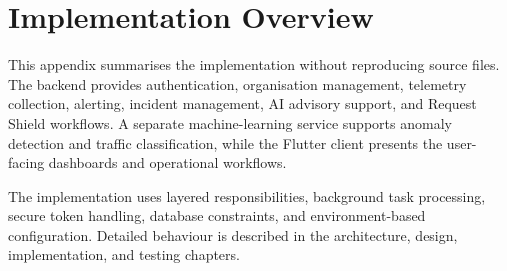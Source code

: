 \chapter{Implementation Overview}

This appendix summarises the implementation without reproducing source files.
The backend provides authentication, organisation management, telemetry
collection, alerting, incident management, AI advisory support, and Request
Shield workflows. A separate machine-learning service supports anomaly
detection and traffic classification, while the Flutter client presents the
user-facing dashboards and operational workflows.

The implementation uses layered responsibilities, background task processing,
secure token handling, database constraints, and environment-based
configuration. Detailed behaviour is described in the architecture, design,
implementation, and testing chapters.

